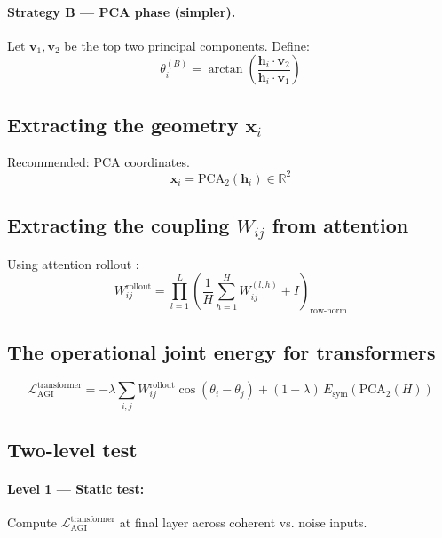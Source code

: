 \documentclass[12pt,a4paper]{article}
\theoremstyle{plain}
\theoremstyle{definition}
\begin{document}
\paragraph{Strategy B --- PCA phase (simpler).}
Let $\mathbf{v}_1, \mathbf{v}_2$ be the top two principal components.
Define:
\begin{equation}
\theta_i^{(B)} = \arctan\!\left(\frac{\mathbf{h}_i \cdot \mathbf{v}_2}
                                      {\mathbf{h}_i \cdot \mathbf{v}_1}\right)
\end{equation}

\subsection{Extracting the geometry $\mathbf{x}_i$}

Recommended: PCA coordinates.
\begin{equation}
\mathbf{x}_i = \text{PCA}_2(\mathbf{h}_i) \in \mathbb{R}^2
\end{equation}

\subsection{Extracting the coupling $W_{ij}$ from attention}

Using attention rollout \citep{abnar2020quantifying}:
\begin{equation}
W_{ij}^{\text{rollout}} = \prod_{l=1}^{L}
  \left(\frac{1}{H}\sum_{h=1}^{H} W_{ij}^{(l,h)} + I\right)_{\!\text{row-norm}}
\end{equation}

\subsection{The operational joint energy for transformers}

\begin{equation}
\mathcal{L}_{\text{AGI}}^{\text{transformer}}
  = -\lambda \sum_{i,j} W_{ij}^{\text{rollout}} \cos\!\left(\theta_i - \theta_j\right)
  + (1-\lambda)\, E_{\text{sym}}\!\left(\text{PCA}_2(H)\right)
\end{equation}

\subsection{Two-level test}

\paragraph{Level 1 --- Static test:}
Compute $\mathcal{L}_{\text{AGI}}^{\text{transformer}}$ at final layer across
coherent vs. noise inputs.
\end{document}
